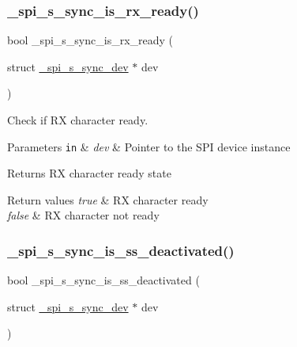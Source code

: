 \subsubsection{\texorpdfstring{\+\_\+spi\+\_\+s\+\_\+sync\+\_\+is\+\_\+rx\+\_\+ready()}{\_spi\_s\_sync\_is\_rx\_ready()}}
{\footnotesize\ttfamily bool \+\_\+spi\+\_\+s\+\_\+sync\+\_\+is\+\_\+rx\+\_\+ready (\begin{DoxyParamCaption}\item[{struct \hyperlink{group__hpl__spi_ga36cf082f9d7764b69f43a52f039e7165}{\+\_\+spi\+\_\+s\+\_\+sync\+\_\+dev} $\ast$}]{dev }\end{DoxyParamCaption})}



Check if RX character ready. 


\begin{DoxyParams}[1]{Parameters}
\mbox{\tt in}  & {\em dev} & Pointer to the S\+PI device instance\\
\hline
\end{DoxyParams}
\begin{DoxyReturn}{Returns}
RX character ready state 
\end{DoxyReturn}

\begin{DoxyRetVals}{Return values}
{\em true} & RX character ready \\
\hline
{\em false} & RX character not ready \\
\hline
\end{DoxyRetVals}
\mbox{\label{group__hpl__spi_gaa51db7f4f9251689e45272535b1f2051}} 
\subsubsection{\texorpdfstring{\+\_\+spi\+\_\+s\+\_\+sync\+\_\+is\+\_\+ss\+\_\+deactivated()}{\_spi\_s\_sync\_is\_ss\_deactivated()}}
{\footnotesize\ttfamily bool \+\_\+spi\+\_\+s\+\_\+sync\+\_\+is\+\_\+ss\+\_\+deactivated (\begin{DoxyParamCaption}\item[{struct \hyperlink{group__hpl__spi_ga36cf082f9d7764b69f43a52f039e7165}{\+\_\+spi\+\_\+s\+\_\+sync\+\_\+dev} $\ast$}]{dev }\end{DoxyParamCaption})}



